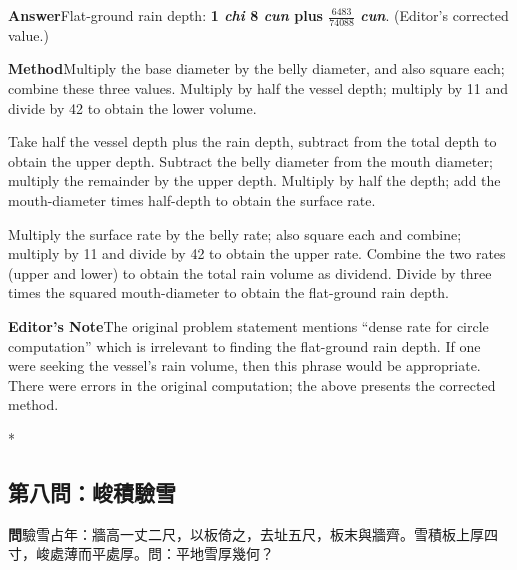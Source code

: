 \documentclass[11pt,a4paper]{article}
\newcommand{\WenCN}{\textbf{\color{headcolor}問}}
\newcommand{\DaEN}{\textbf{\color{headcolor}Answer}}
\newcommand{\ShuEN}{\textbf{\color{headcolor}Method}}
\newcommand{\AnEN}{\textbf{\color{headcolor}Editor's Note}}
\begin{document}
\vspace{0.5em}
\DaEN{}\quad Flat-ground rain depth: \textbf{1 \textit{chi} 8 \textit{cun} plus $\frac{6483}{74088}$ \textit{cun}}. (Editor's corrected value.)

\vspace{0.5em}
\ShuEN{}\quad Multiply the base diameter by the belly diameter, and also square each; combine these three values. Multiply by half the vessel depth; multiply by 11 and divide by 42 to obtain the lower volume.

Take half the vessel depth plus the rain depth, subtract from the total depth to obtain the upper depth. Subtract the belly diameter from the mouth diameter; multiply the remainder by the upper depth. Multiply by half the depth; add the mouth-diameter times half-depth to obtain the surface rate.

Multiply the surface rate by the belly rate; also square each and combine; multiply by 11 and divide by 42 to obtain the upper rate. Combine the two rates (upper and lower) to obtain the total rain volume as dividend. Divide by three times the squared mouth-diameter to obtain the flat-ground rain depth.

\vspace{0.5em}
\AnEN{}\quad The original problem statement mentions ``dense rate for circle computation'' which is irrelevant to finding the flat-ground rain depth. If one were seeking the vessel's rain volume, then this phrase would be appropriate. There were errors in the original computation; the above presents the corrected method.

\newpage

\switchcolumn[0]*
\subsection*{第八問：峻積驗雪}

\vspace{0.5em}
\WenCN{}\quad 驗雪占年：牆高一丈二尺，以板倚之，去址五尺，板末與牆齊。雪積板上厚四寸，峻處薄而平處厚。問：平地雪厚幾何？

\begin{center}
\end{center}
\end{document}
